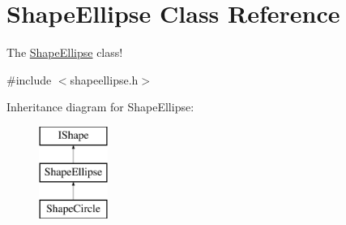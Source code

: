 \hypertarget{class_shape_ellipse}{}\section{Shape\+Ellipse Class Reference}
\label{class_shape_ellipse}


The \mbox{\hyperlink{class_shape_ellipse}{Shape\+Ellipse}} class!  




{\ttfamily \#include $<$shapeellipse.\+h$>$}

Inheritance diagram for Shape\+Ellipse\+:\begin{figure}[H]
\begin{center}
\leavevmode
\includegraphics[height=3.000000cm]{class_shape_ellipse}
\end{center}
\end{figure}
